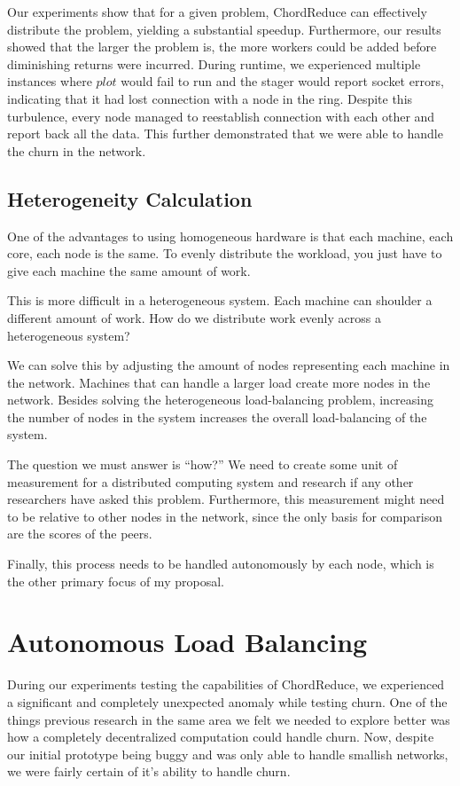 Our experiments show that for a given problem, ChordReduce can effectively distribute the problem, yielding a substantial speedup.  Furthermore, our results showed that the larger the problem is, the more workers could be added before diminishing returns were incurred.  During runtime, we experienced multiple instances where $plot$ would fail to run and the stager would report socket errors, indicating that it had lost connection with a node in the ring.  Despite this turbulence, every node managed to reestablish connection with each other and report back all the data.  This further demonstrated that we were able to handle the churn in the network.


\subsection{Heterogeneity Calculation}

One of the advantages to using homogeneous hardware is that each machine, each core, each node is the same.
To evenly distribute the workload, you just have to give each machine the same amount of work.

This is more difficult in a heterogeneous system.
Each machine can shoulder a different amount of work.
How do we distribute work evenly across a heterogeneous system?

We can solve this by adjusting the amount of nodes representing each machine in the network.
Machines that can handle a larger load create more nodes in the network.
Besides solving the heterogeneous load-balancing problem, increasing the number of nodes in the system increases the overall load-balancing of the system.


The question we must answer is ``how?''
We need to create some unit of measurement for a distributed computing system and research if any other researchers have asked this problem.
Furthermore, this measurement might need to be relative to other nodes in the network, since the only basis for comparison are the scores of the peers.

Finally, this process needs to be handled autonomously by each node, which is the other primary focus of my proposal.
\section{Autonomous Load Balancing}
\label{sec:auto-load-bal}


During our experiments testing the capabilities of ChordReduce, we experienced a significant and completely unexpected anomaly while testing churn.
One of the things previous research \cite{marozzo2012p2p}  \cite{leemap} in the same area we felt we needed to explore better was how a completely decentralized computation could handle churn.
Now, despite our initial prototype being buggy and was only able to handle smallish networks, we were fairly certain of it's ability to handle churn.

